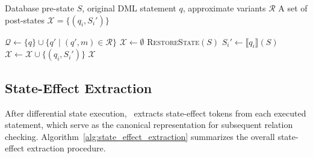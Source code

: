 \begin{algorithm}[t]
	\caption{Differential State Execution}
	\footnotesize
	\label{alg:differential_state_execution}
	\begin{algorithmic}[1]
		\Require Database pre-state $S$, original DML statement $q$, approximate variants $\mathcal{R}$
		\Ensure A set of post-states $\mathcal{X} = \{(q_i, S_i')\}$
		
		\State $\mathcal{Q} \gets \{q\} \cup \{q' \mid (q', m) \in \mathcal{R}\}$
		\State $\mathcal{X} \gets \emptyset$
		\State \textsc{RestoreState}$(S)$
		\State $S_i' \gets \llbracket q_i \rrbracket(S)$
		\State $\mathcal{X} \gets \mathcal{X} \cup \{(q_i, S_i')\}$
		\EndFor
		\State \Return $\mathcal{X}$
	\end{algorithmic}
\end{algorithm}

\subsection{State-Effect Extraction}
\label{subsec:State-Effect Extraction}

After differential state execution, \toolname\ extracts state-effect tokens from each executed statement, which serve as the canonical representation for subsequent relation checking.
Algorithm~\ref{alg:state_effect_extraction} summarizes the overall state-effect extraction procedure.

